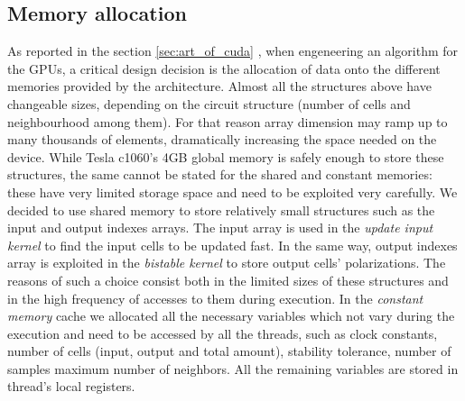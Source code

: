 \subsection{Memory allocation}
As reported in the section \ref{sec:art_of_cuda} , when engeneering an algorithm for the GPUs, a critical
design decision is the allocation of data onto the different memories provided by the architecture.
Almost all the structures above have changeable sizes, depending on the circuit structure (number of cells and neighbourhood among them).
For that reason array dimension may ramp up to many thousands of elements, dramatically increasing the space needed on the device.
While Tesla c1060's 4GB global memory is safely enough to store these structures, the same cannot be stated for the shared and constant
memories: these have very limited storage space and need to be exploited very carefully.
We decided to use shared memory to store relatively small structures such as the input and output indexes arrays. The input array is used
in the \textit{update input kernel} to find the input cells to be updated fast. In the same way, output indexes array is exploited 
in the \textit{bistable kernel} to store output cells' polarizations.\newline
The reasons of such a choice consist both in the limited sizes of these structures and in the high frequency of accesses to them during
execution.\newline
In the \textit{constant memory} cache we allocated all the necessary variables which not vary during the execution and need to be accessed
by all the threads, such as clock constants, number of cells (input, output and total amount), stability tolerance, number of samples 
 maximum number of neighbors. All the remaining variables are stored in thread's local registers.\newline

